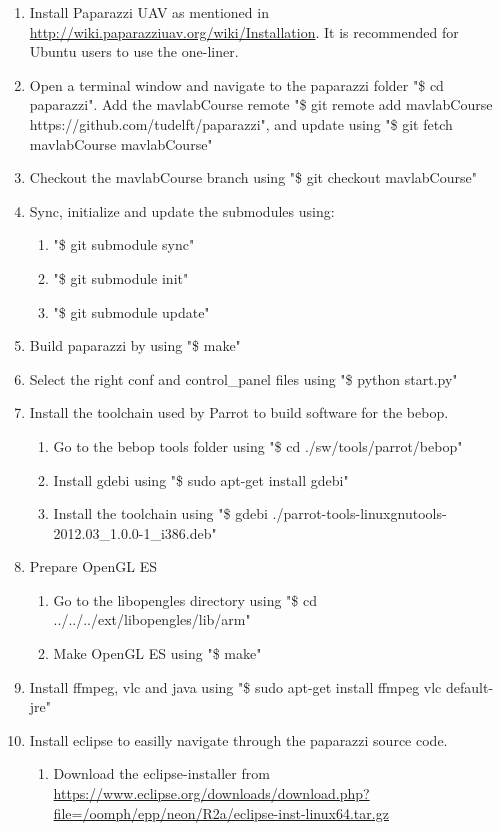 \documentclass{article}
\begin{document}
\begin{enumerate}
\item{Install Paparazzi UAV as mentioned in \url{http://wiki.paparazziuav.org/wiki/Installation}. It is recommended for Ubuntu users to use the one-liner.}
\item{Open a terminal window and navigate to the paparazzi folder "\$ cd paparazzi". Add the mavlabCourse remote "\$ git remote add mavlabCourse https://github.com/tudelft/paparazzi", and update using "\$ git fetch mavlabCourse mavlabCourse"}
\item{Checkout the mavlabCourse branch using "\$ git checkout mavlabCourse"}
\item{Sync, initialize and update the submodules using:
\begin{enumerate}
\item{"\$ git submodule sync"}
\item{"\$ git submodule init"}
\item{"\$ git submodule update"}
\end{enumerate}
}
\item{Build paparazzi by using "\$ make"}
\item{Select the right conf and control\_panel files using "\$ python start.py"}
\item{Install the toolchain used by Parrot to build software for the bebop.
\begin{enumerate}
\item{Go to the bebop tools folder using "\$ cd ./sw/tools/parrot/bebop"}
\item{Install gdebi using "\$ sudo apt-get install gdebi"}
\item{Install the toolchain using "\$ gdebi ./parrot-tools-linuxgnutools-2012.03\_1.0.0-1\_i386.deb"}
\end{enumerate}
}
\item{Prepare OpenGL ES
\begin{enumerate}
\item{Go to the libopengles directory using "\$ cd ../../../ext/libopengles/lib/arm"}
\item{Make OpenGL ES using "\$ make"}
\end{enumerate}
}
\item{Install ffmpeg, vlc and java using "\$ sudo apt-get install ffmpeg vlc default-jre"}
\item{Install eclipse to easilly navigate through the paparazzi source code.
\begin{enumerate}
\item{Download the eclipse-installer from \url{https://www.eclipse.org/downloads/download.php?file=/oomph/epp/neon/R2a/eclipse-inst-linux64.tar.gz}}

\end{enumerate}}
\end{enumerate}
\end{document}
